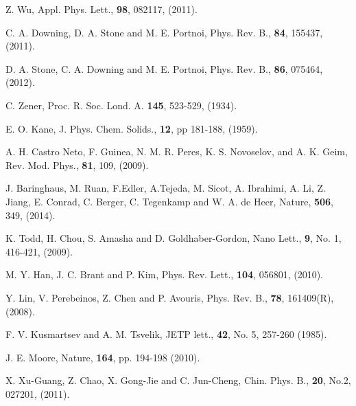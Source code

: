 \documentclass[prl,twocolumn,aps,superscriptaddress,floatfix,10pt]{revtex4}
\begin{document}
\begin{thebibliography}{10}
Z. Wu,
\newblock Appl. Phys. Lett., {\bf 98}, 082117, (2011).

C. A. Downing, D. A. Stone and M. E. Portnoi,
\newblock Phys. Rev. B., {\bf 84}, 155437, (2011).

D. A. Stone, C. A. Downing and M. E. Portnoi,
\newblock Phys. Rev. B., {\bf 86}, 075464, (2012).

C. Zener,
\newblock Proc. R. Soc. Lond. A. {\bf 145}, 523-529, (1934).

E. O. Kane,
\newblock J. Phys. Chem. Solids., {\bf 12}, pp 181-188, (1959).

A. H. Castro Neto, F. Guinea, N. M. R. Peres, K. S. Novoselov, and A. K. Geim,
\newblock Rev. Mod. Phys., {\bf 81}, 109, (2009).

J. Baringhaus, M. Ruan, F.Edler, A.Tejeda, M. Sicot, A. Ibrahimi, A. Li, Z. Jiang, E. Conrad, C. Berger, C. Tegenkamp and W. A. de Heer,
\newblock Nature, {\bf 506},  349, (2014).

K. Todd, H. Chou, S. Amasha and D. Goldhaber-Gordon,
\newblock Nano Lett., {\bf 9}, No. 1, 416-421, (2009).

M. Y. Han, J. C. Brant and P. Kim,
\newblock Phys. Rev. Lett., {\bf 104}, 056801, (2010).

Y. Lin, V. Perebeinos, Z. Chen and P. Avouris,
\newblock Phys. Rev. B., {\bf 78}, 161409(R), (2008).


F. V. Kusmartsev and A. M. Tsvelik,
\newblock JETP lett., {\bf 42}, No. 5, 
257-260 (1985).

 J. E. Moore, %
Nature, {\bf164}, pp. 194-198 (2010).

X. Xu-Guang, Z. Chao, X. Gong-Jie and C. Jun-Cheng,
\newblock Chin. Phys. B., {\bf 20}, No.2, 027201, (2011).


\end{thebibliography}
\end{document}

